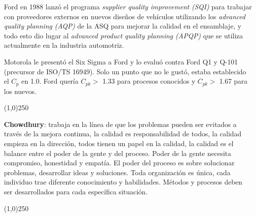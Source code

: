 \documentclass[oneside]{book}
\begin{document}
Ford en 1988 lanzó el programa \textit{supplier quality improvement (SQI)} para trabajar con proveedores externos en nuevos diseños de vehículos utilizando los \textit{advanced quality planning (AQP)} de la ASQ para mejorar la calidad en el ensamblaje, y todo esto dio lugar al \textit{advanced product quality planning (APQP)} que se utiliza actualmente en la industria automotriz. 

Motorola le presentó el Six Sigma a Ford y lo evaluó contra Ford Q1 y Q-101 (precursor de ISO/TS 16949). Solo un punto que no le gustó, estaba establecido el $C_p$ en 1.0. Ford quería $C_{pk} >$ 1.33 para procesos conocidos y $C_{pk} >$ 1.67 para los nuevos.

\begin{center}
	\line(1,0){250}
\end{center}

\textbf{Chowdhury}: trabaja en la línea de que los problemas pueden ser evitados a través de la mejora continua, la calidad es responsabilidad de todos, la calidad empieza en la dirección, todos tienen un papel en la calidad, la calidad es el balance entre el poder de la gente y del proceso. Poder de la gente necesita compromiso, honestidad y empatía. El poder del proceso es sobre solucionar problemas, desarrollar ideas y soluciones. Toda organización es única, cada individuo trae diferente conocimiento y habilidades. Métodos y procesos deben ser desarrollados para cada específica situación.

\begin{center}
	\line(1,0){250}
\end{center}
\end{document}
